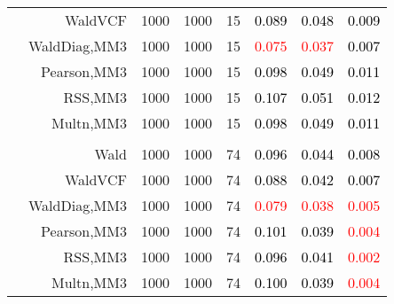 \documentclass[
]{article}
\begin{document}
\begin{table}[H]
{\begin{tabular}[t]{lrrrrrrr}
\hspace{1em} & WaldVCF & 1000 & 1000 & 15 & \textcolor{black}{0.089} & \textcolor{black}{0.048} & \textcolor{black}{0.009}\\

\hspace{1em} & WaldDiag,MM3 & 1000 & 1000 & 15 & \textcolor{red}{0.075} & \textcolor{red}{0.037} & \textcolor{black}{0.007}\\

\hspace{1em} & Pearson,MM3 & 1000 & 1000 & 15 & \textcolor{black}{0.098} & \textcolor{black}{0.049} & \textcolor{black}{0.011}\\

\hspace{1em} & RSS,MM3 & 1000 & 1000 & 15 & \textcolor{black}{0.107} & \textcolor{black}{0.051} & \textcolor{black}{0.012}\\

\hspace{1em} & Multn,MM3 & 1000 & 1000 & 15 & \textcolor{black}{0.098} & \textcolor{black}{0.049} & \textcolor{black}{0.011}\\
\cmidrule{1-8}
\addlinespace[0.3em]
\multicolumn{8}{l}{\textbf{3F 15V}}\\
\hspace{1em} & Wald & 1000 & 1000 & 74 & \textcolor{black}{0.096} & \textcolor{black}{0.044} & \textcolor{black}{0.008}\\

\hspace{1em} & WaldVCF & 1000 & 1000 & 74 & \textcolor{black}{0.088} & \textcolor{black}{0.042} & \textcolor{black}{0.007}\\

\hspace{1em} & WaldDiag,MM3 & 1000 & 1000 & 74 & \textcolor{red}{0.079} & \textcolor{red}{0.038} & \textcolor{red}{0.005}\\

\hspace{1em} & Pearson,MM3 & 1000 & 1000 & 74 & \textcolor{black}{0.101} & \textcolor{black}{0.039} & \textcolor{red}{0.004}\\

\hspace{1em} & RSS,MM3 & 1000 & 1000 & 74 & \textcolor{black}{0.096} & \textcolor{black}{0.041} & \textcolor{red}{0.002}\\

\hspace{1em} & Multn,MM3 & 1000 & 1000 & 74 & \textcolor{black}{0.100} & \textcolor{black}{0.039} & \textcolor{red}{0.004}\\
\bottomrule
\end{tabular}}
\endgroup{}
\end{table}
\end{document}
